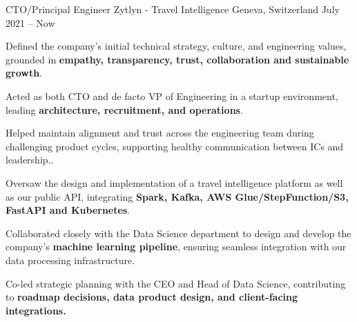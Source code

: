 

\begin{cventries}

\cventry
  {CTO/Principal Engineer} %
  {Zytlyn - Travel Intelligence} %
  {Geneva, Switzerland} %
  {July 2021 – Now} %
  {
    \begin{cvitems} %
      \item {Defined the company's initial technical strategy, culture, and engineering values, grounded in \textbf{empathy, transparency, trust, collaboration and sustainable growth}.}
      \item {Acted as both CTO and de facto VP of Engineering in a startup environment, leading \textbf{architecture, recruitment, and operations}.}
      \item {Helped maintain alignment and trust across the engineering team during challenging product cycles, supporting healthy communication between ICs and leadership..}
      \item {Oversaw the design and implementation of a travel intelligence platform as well as our public API, integrating \textbf{Spark, Kafka, AWS Glue/StepFunction/S3, FastAPI and Kubernetes}.}
      \item {Collaborated closely with the Data Science department to design and develop the company's \textbf{machine learning pipeline}, ensuring seamless integration with our data processing infrastructure.}
      \item {Co-led strategic planning with the CEO and Head of Data Science, contributing to \textbf{roadmap decisions, data product design, and client-facing integrations.}}
    \end{cvitems}
  }


\end{cventries}
